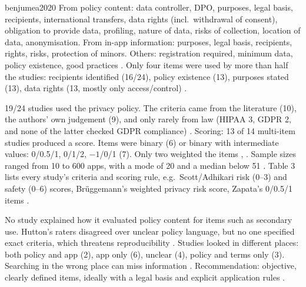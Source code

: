 \begin{papercard}{benjumea2020}
 From policy content: data controller, DPO, purposes, legal basis, recipients, international transfers, data rights (incl.\ withdrawal of consent), obligation to provide data, profiling, nature of data, risks of collection, location of data, anonymisation. From in-app information: purposes, legal basis, recipients, rights, risks, protection of minors. Others: registration required, minimum data, policy existence, good practices . Only four items were used by more than half the studies: recipients identified (16/24), policy existence (13), purposes stated (13), data rights (13, mostly only access/control) .

 19/24 studies used the privacy policy. The criteria came from the literature (10), the authors' own judgement (9), and only rarely from law (HIPAA 3, GDPR 2, and none of the latter checked GDPR compliance) . Scoring: 13 of 14 multi-item studies produced a score. Items were binary (6) or binary with intermediate values: 0/0.5/1, 0/1/2, $-1$/0/1 (7). Only two weighted the items , . Sample sizes ranged from 10 to 600 apps, with a mode of 20 and a median below 51 . Table 3 lists every study's criteria and scoring rule, e.g.\ Scott/Adhikari risk (0--3) and safety (0--6) scores, Brüggemann's weighted privacy risk score, Zapata's 0/0.5/1 items .

 No study explained how it evaluated policy content for items such as secondary use. Hutton's raters disagreed over unclear policy language, but no one specified exact criteria, which threatens reproducibility . Studies looked in different places: both policy and app (2), app only (6), unclear (4), policy and terms only (3). Searching in the wrong place can miss information . Recommendation: objective, clearly defined items, ideally with a legal basis and explicit application rules .


\end{papercard}
